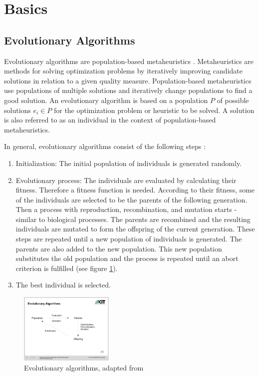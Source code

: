 \section{Basics}

\subsection{Evolutionary Algorithms} \label{sec:EA}

Evolutionary algorithms are population-based metaheuristics \cite{EA}. Metaheuristics are methods for solving optimization problems by iteratively improving candidate solutions in relation to a given quality measure.
Population-based metaheuristics use populations of multiple solutions and iteratively change populations to find a good solution.
An evolutionary algorithm is based on a population $P$ of possible solutions $e_i \in P$ for the optimization problem or heuristic to be solved. A solution is also referred to as an individual in the context of population-based metaheuristics.

In general, evolutionary algorithms consist of the following steps \cite{EA}:

\begin{enumerate}
\item Initialization: The initial population of individuals is generated randomly.

\item Evolutionary process: The individuals are evaluated by calculating their fitness. Therefore a fitness function is needed.
According to their fitness, some of the individuals are selected to be the parents of the following generation.
Then a process with reproduction, recombination, and mutation starts - similar to biological processes.
The parents are recombined and the resulting individuals are mutated to form the offspring of the current generation.
These steps are repeated until a new population of individuals is generated. The parents are also added to the new population. This new population substitutes the old population and the process is repeated until an abort criterion is fulfilled  (see figure \ref{fig:EA}).

\item The best individual is selected.
\end{enumerate}


\begin{figure}
	\begin{center}
		\includegraphics[trim = 2.2cm 6cm 4.1cm 6cm, clip, width=0.4\textwidth]{EA}
	\end{center}
	\caption{Evolutionary algorithms, adapted from \cite{EA}}
	\label{fig:EA}
\end{figure}

